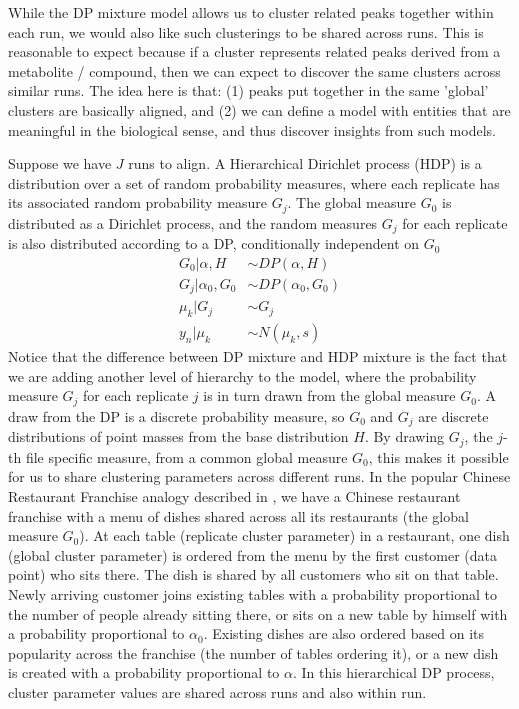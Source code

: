 While the DP mixture model allows us to cluster related peaks together within each run, we would also like such clusterings to be shared across runs. This is reasonable to expect because if a cluster represents related peaks derived from a metabolite / compound, then we can expect to discover the same clusters across similar runs. The idea here is that: (1) peaks put together in the same 'global' clusters are basically aligned, and (2) we can define a model with entities that are meaningful in the biological sense, and thus discover insights from such models.

Suppose we have $J$ runs to align. A Hierarchical Dirichlet process (HDP) is a distribution over a set of random probability measures, where each replicate has its associated random probability measure $G_{j}$. The global measure $G_{0}$ is distributed as a Dirichlet process, and the random measures $G_{j}$ for each replicate is also distributed according to a DP, conditionally independent on $G_{0}$
\begin{align}
G_{0}|\alpha,H & \sim DP(\alpha,H)\\
G_{j}|\alpha_{0},G_{0} & \sim DP(\alpha_{0},G_{0})\\
\mu_{k}|G_{j} & \sim G_{j}\\
y_{n}|\mu_{k} & \sim{N}(\mu_{k},s)
\end{align}
Notice that the difference between DP mixture and HDP mixture is the fact that we are adding another level of hierarchy to the model, where the probability measure $G_{j}$ for each replicate $j$ is in turn drawn from the global measure $G_{0}$. A draw from the DP is a discrete probability measure, so $G_{0}$ and $G_{j}$ are discrete distributions of point masses from the base distribution $H$. By drawing $G_{j}$, the $j$-th file specific measure, from a common global measure $G_{0}$, this makes it possible for us to share clustering parameters across different runs. In the popular Chinese Restaurant Franchise analogy described in \cite{Teh2005}, we have a Chinese restaurant franchise with a menu of dishes shared across all its restaurants (the global measure $G_{0}$). At each table (replicate cluster parameter) in a restaurant, one dish (global cluster parameter) is ordered from the menu by the first customer (data point) who sits there. The dish is shared by all customers who sit on that table. Newly arriving customer joins existing tables with a probability proportional to the number of people already sitting there, or sits on a new table by himself with a probability proportional to $\alpha_{0}$. Existing dishes are also ordered based on its popularity across the franchise (the number of tables ordering it), or a new dish is created with a probability proportional to $\alpha$. In this hierarchical DP process, cluster parameter values are shared across runs and also within run. 

